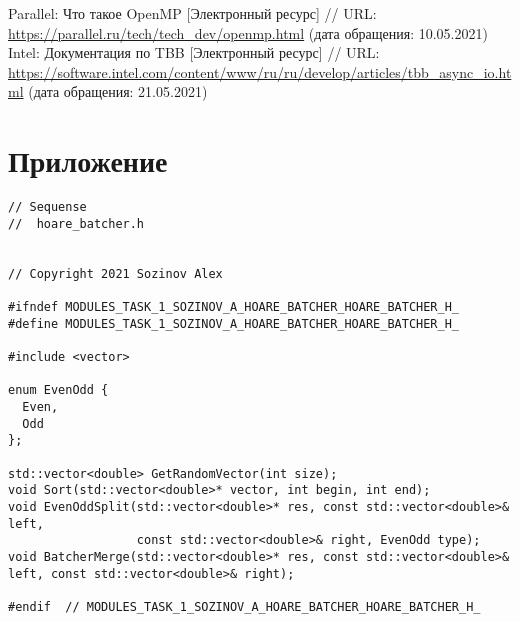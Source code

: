 \documentclass{report}
\begin{document}
\begin{thebibliography}{1}
 Parallel: Что такое OpenMP [Электронный ресурс] // URL: \url { https://parallel.ru/tech/tech_dev/openmp.html} (дата обращения: 10.05.2021)
 Intel: Документация по TBB [Электронный ресурс] // URL: \url {https://software.intel.com/content/www/ru/ru/develop/articles/tbb_async_io.html} (дата обращения: 21.05.2021)

\end{thebibliography}

\newpage
\section*{Приложение}
\begin{lstlisting}
// Sequense
//  hoare_batcher.h


// Copyright 2021 Sozinov Alex

#ifndef MODULES_TASK_1_SOZINOV_A_HOARE_BATCHER_HOARE_BATCHER_H_
#define MODULES_TASK_1_SOZINOV_A_HOARE_BATCHER_HOARE_BATCHER_H_

#include <vector>

enum EvenOdd {
  Even,
  Odd
};

std::vector<double> GetRandomVector(int size);
void Sort(std::vector<double>* vector, int begin, int end);
void EvenOddSplit(std::vector<double>* res, const std::vector<double>& left,
                  const std::vector<double>& right, EvenOdd type);
void BatcherMerge(std::vector<double>* res, const std::vector<double>& left, const std::vector<double>& right);

#endif  // MODULES_TASK_1_SOZINOV_A_HOARE_BATCHER_HOARE_BATCHER_H_

\end{lstlisting}
\end{document}
